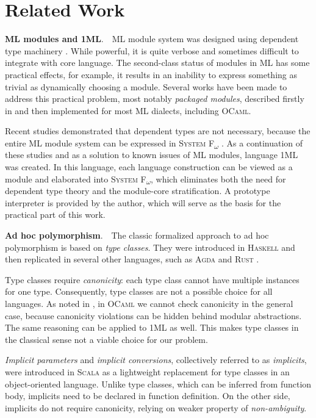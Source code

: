 \documentclass{spbau-diploma}
\begin{document}
\section{Related Work}

\textbf{\textsc{ML} modules and \textsc{1ML}}.~~\textsc{ML} module system was designed using dependent type machinery \cite{dependent_types}. While powerful, it is quite verbose and sometimes difficult to integrate with core language. The second-class status of modules in \textsc{ML} has some practical effects, for example, it results in an inability to express something as trivial as dynamically choosing a module. Several works have been made to address this practical problem, most notably \textit{packaged modules}, described firstly in \cite{packaged} and then implemented for most \textsc{ML} dialects, including \textsc{OCaml}.

Recent studies demonstrated that dependent types are not necessary, because the entire \textsc{ML} module system can be expressed in \textsc{System F\textsubscript{$\omega$}} \cite{fing}. As a continuation of these studies and as a solution to known issues of \textsc{ML} modules, language \textsc{1ML} \cite{1ml} was created. In this language, each language construction can be viewed as a module and elaborated into \textsc{System F\textsubscript{$\omega$}}, which eliminates both the need for dependent type theory and the module-core stratification. A prototype interpreter is provided by the author, which will serve as the basis for the practical part of this work.

\textbf{Ad hoc polymorphism}.~~The classic formalized approach to ad hoc polymorphism is based on \textit{type classes}. They were introduced in \textsc{Haskell} \cite{adhoc} and then replicated in several other languages, such as \textsc{Agda} \cite{agda} and \textsc{Rust} \cite{rust}. 

Type classes require \textit{canonicity}: each type class cannot have multiple instances for one type. Consequently, type classes are not a possible choice for all languages. As noted in \cite{white}, in \textsc{OCaml} we cannot check canonicity in the general case, because canonicity violations can be hidden behind modular abstractions. The same reasoning can be applied to \textsc{1ML} as well. This makes type classes in the сlassical sense not a viable choice for our problem.

\textit{Implicit parameters} and \textit{implicit conversions}, collectively referred to as \textit{implicits}, were introduced in \textsc{Scala} \cite{implicits} as a lightweight replacement for type classes in an object-oriented language. Unlike type classes, which can be inferred from function body, implicits need to be declared in function definition. On the other side, implicits do not require canonicity, relying on weaker property of \textit{non-ambiguity}.
\end{document}
